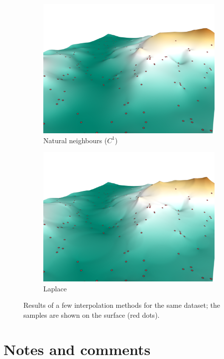 \begin{figure}
\begin{subfigure}[b]{0.41\linewidth}
    \includegraphics{figs/results/nni_c1.png}
    \caption{Natural neighbours ($C^1$)}
  \end{subfigure}  
  \quad
  \begin{subfigure}[b]{0.41\linewidth}
    \centering
    \includegraphics{figs/results/laplace.png}
    \caption{Laplace}
  \end{subfigure}  
\caption{Results of a few interpolation methods for the same dataset; the samples are shown on the surface (red dots).}%
\end{figure}


%
\section{Notes and comments}

